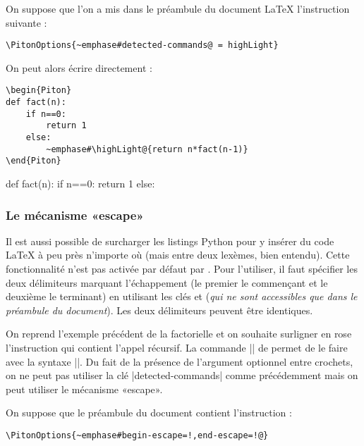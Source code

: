 \documentclass[dvipsnames,svgnames]{article}
\begin{document}
\smallskip
On suppose que l'on a mis dans le préambule du document LaTeX l'instruction suivante :
\begin{Verbatim}
\PitonOptions{~emphase#detected-commands@ = highLight}
\end{Verbatim}

On peut alors écrire directement :
\begin{Verbatim}
\begin{Piton}
def fact(n):
    if n==0:
        return 1
    else:
        ~emphase#\highLight@{return n*fact(n-1)}
\end{Piton}
\end{Verbatim}

\begin{Piton}
def fact(n):
    if n==0:
        return 1
    else:
\end{Piton}


\subsubsection{Le mécanisme «escape»}

\label{escape}

Il est aussi possible de surcharger les listings Python pour y insérer du code LaTeX à peu près n'importe où (mais
entre deux lexèmes, bien entendu). Cette fonctionnalité n'est pas activée par défaut par . Pour
l'utiliser, il faut spécifier les deux délimiteurs marquant l'échappement (le premier le commençant et le deuxième
le terminant) en utilisant les clés  et  (\emph{qui ne sont accessibles
que dans le préambule du document}). Les deux délimiteurs peuvent être identiques.

\medskip
On reprend l'exemple précédent de la factorielle et on souhaite surligner en rose l'instruction qui contient l'appel
récursif. La commande |\highLight| de  permet de le faire avec la syntaxe ||.
Du fait de la présence de l'argument optionnel entre crochets, on ne peut pas utiliser la clé |detected-commands|
comme précédemment mais on peut utiliser le mécanisme «escape».

\smallskip
On suppose que le préambule du document contient l'instruction :

\begin{Verbatim}
\PitonOptions{~emphase#begin-escape=!,end-escape=!@}
\end{Verbatim}
\end{document}
